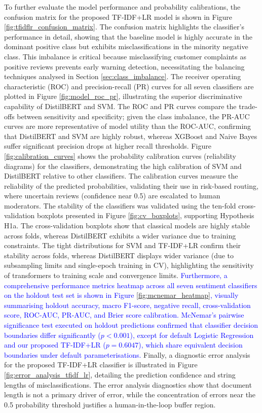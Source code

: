 \documentclass[authoryear,review,3p,times,12pt]{elsarticle}
\newcommand{\update}[1]{\textcolor{blue}{#1}}
\begin{document}
To further evaluate the model performance and probability calibrations, the confusion matrix for the proposed TF-IDF+LR model is shown in Figure \ref{fig:tfidflr_confusion_matrix}. The confusion matrix highlights the classifier's performance in detail, showing that the baseline model is highly accurate in the dominant positive class but exhibits misclassifications in the minority negative class. This imbalance is critical because misclassifying customer complaints as positive reviews prevents early warning detection, necessitating the balancing techniques analysed in Section \ref{sec:class_imbalance}. The receiver operating characteristic (ROC) and precision-recall (PR) curves for all seven classifiers are plotted in Figure \ref{fig:model_roc_pr}, illustrating the superior discriminative capability of DistilBERT and SVM. The ROC and PR curves compare the trade-offs between sensitivity and specificity; given the class imbalance, the PR-AUC curves are more representative of model utility than the ROC-AUC, confirming that DistilBERT and SVM are highly robust, whereas XGBoost and Naive Bayes suffer significant precision drops at higher recall thresholds. Figure \ref{fig:calibration_curves} shows the probability calibration curves (reliability diagrams) for the classifiers, demonstrating the high calibration of SVM and DistilBERT relative to other classifiers. The calibration curves measure the reliability of the predicted probabilities, validating their use in risk-based routing, where uncertain reviews (confidence near 0.5) are escalated to human moderators. The stability of the classifiers was validated using the ten-fold cross-validation boxplots presented in Figure \ref{fig:cv_boxplots}, supporting Hypothesis H1a. The cross-validation boxplots show that classical models are highly stable across folds, whereas DistilBERT exhibits a wider variance due to training constraints. The tight distributions for SVM and TF-IDF+LR confirm their stability across folds, whereas DistilBERT displays wider variance (due to subsampling limits and single-epoch training in CV), highlighting the sensitivity of transformers to training scale and convergence limits. \update{Furthermore, a comprehensive performance metrics heatmap across all seven sentiment classifiers on the holdout test set is shown in Figure \ref{fig:mcnemar_heatmap}, visually summarising holdout accuracy, macro F1-score, negative recall, cross-validation score, ROC-AUC, PR-AUC, and Brier score calibration. McNemar's pairwise significance test executed on holdout predictions confirmed that classifier decision boundaries differ significantly ($p < 0.001$), except for default Logistic Regression and our proposed TF-IDF+LR ($p = 0.6047$), which share equivalent decision boundaries under default parameterisations.} Finally, a diagnostic error analysis for the proposed TF-IDF+LR classifier is illustrated in Figure \ref{fig:error_analysis_tfidf_lr}, detailing the prediction confidence and string lengths of misclassifications. The error analysis diagnostics show that document length is not a primary driver of error, while the concentration of errors near the 0.5 probability threshold justifies a human-in-the-loop buffer region.
\end{document}
